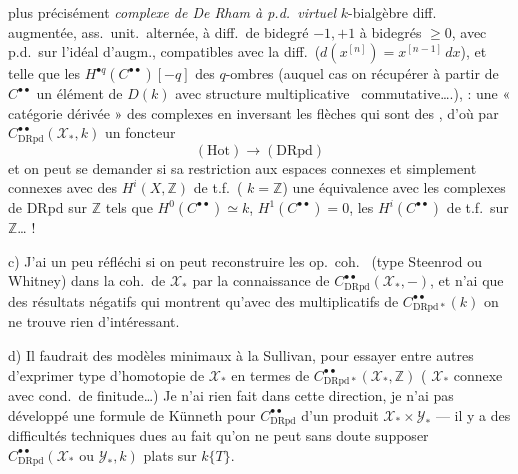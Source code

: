 \documentclass[11pt,a4paper]{article}
\begin{document}
plus précisément  \emph{complexe de De Rham à p.d.\ virtuel}   $k$-bialgèbre diff.\ \struck{\ill{}} augmentée, ass.\ unit.\ alternée, à diff.\ de bidegré $-1,+1$  à bidegrés $\geq 0$, avec p.d.\ sur l'idéal d'augm., compatibles avec la diff.\ ($d(x^{[n]}) = x^{[n-1]}\,dx$), et telle que les $H^{\bullet q}(C^{\bullet\bullet})[-q]$ \struck{\ill{}}  des $q$-ombres (auquel cas on  récupérer à partir de $C^{\bullet\bullet}$ un élément de $D(k)$ avec structure multiplicative \ commutative….),  : une « catégorie dérivée » des  complexes en inversant les flèches qui sont des , d'où par $C^{\bullet\bullet}_{\mathrm{DRpd}}(\mathcal{X}_*, k)$ un foncteur
\[ (\mathrm{Hot}) \to (\mathrm{DRpd}) \]
et on peut se demander si sa restriction aux espaces connexes et simplement connexes avec des $H^i(X,\mathbb{Z})$ de t.f.\ ( $k = \mathbb{Z}$) \struck{\ill{}}  une équivalence avec les complexes de DRpd sur $\mathbb{Z}$ tels que $H^0(C^{\bullet\bullet}) \simeq k$, $H^1(C^{\bullet\bullet}) = 0$, les $H^i(C^{\bullet\bullet})$ de t.f.\ sur $\mathbb{Z}$… !

c) J'ai un peu réfléchi \struck{\ill{}} si on peut reconstruire les op.\ coh.\ \struck{\ill{}} (type Steenrod ou Whitney) dans la coh.\ de $\mathcal{X}_*$ par la connaissance de $C^{\bullet\bullet}_{\mathrm{DRpd}}(\mathcal{X}_*, -)$, et n'ai que des résultats  négatifs qui montrent qu'avec des  \struck{\ill{}} multiplicatifs de $C^{\bullet\bullet}_{\mathrm{DRpd}*}(k)$ on ne trouve rien d'intéressant.

d) Il faudrait    des modèles minimaux à la Sullivan, pour essayer entre autres d'exprimer    type d'homotopie de $\mathcal{X}_*$ en termes de $C^{\bullet\bullet}_{\mathrm{DRpd}*}(\mathcal{X}_*, \mathbb{Z})$ (   $\mathcal{X}_*$  connexe avec cond.\ de finitude…) Je n'ai rien fait dans cette direction, je n'ai  pas développé une formule de Künneth pour $C^{\bullet\bullet}_{\mathrm{DRpd}}$ d'un produit $\mathcal{X}_* \times \mathcal{Y}_*$ — il y a des difficultés techniques dues au fait qu'on ne peut sans doute supposer $C^{\bullet\bullet}_{\mathrm{DRpd}}(\mathcal{X}_* \text{ ou } \mathcal{Y}_*, k)$ plats \struck{\ill{}} sur $k\{T\}$.
\end{document}
